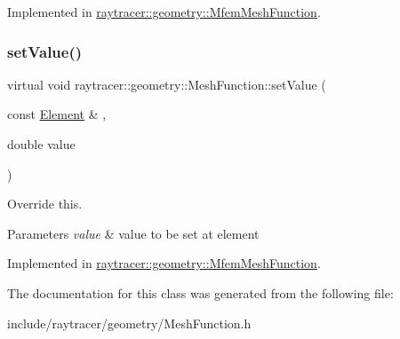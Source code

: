 Implemented in \hyperlink{classraytracer_1_1geometry_1_1MfemMeshFunction_a76b37f146c8471f95c0e2486024857f7}{raytracer\+::geometry\+::\+Mfem\+Mesh\+Function}.

\mbox{\label{classraytracer_1_1geometry_1_1MeshFunction_a9e677af2a48d1b372b19fd6462612744}} 
\subsubsection{\texorpdfstring{set\+Value()}{setValue()}}
{\footnotesize\ttfamily virtual void raytracer\+::geometry\+::\+Mesh\+Function\+::set\+Value (\begin{DoxyParamCaption}\item[{const \hyperlink{classraytracer_1_1geometry_1_1Element}{Element} \&}]{,  }\item[{double}]{value }\end{DoxyParamCaption})\hspace{0.3cm}{\ttfamily [pure virtual]}}



Override this. 


\begin{DoxyParams}{Parameters}
{\em value} & value to be set at element \\
\hline
\end{DoxyParams}


Implemented in \hyperlink{classraytracer_1_1geometry_1_1MfemMeshFunction_a3153afe8fbdf71f1f5f7d7a44c507536}{raytracer\+::geometry\+::\+Mfem\+Mesh\+Function}.



The documentation for this class was generated from the following file\+:\begin{DoxyCompactItemize}
\item 
include/raytracer/geometry/Mesh\+Function.\+h\end{DoxyCompactItemize}
